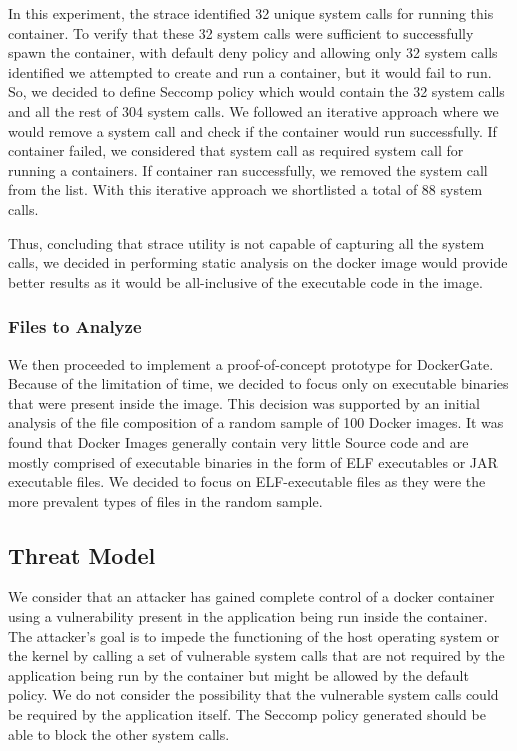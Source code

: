 In this experiment, the strace identified 32 unique system calls for running this container. To verify that these 32 system calls were sufficient to successfully spawn the container, with default deny policy and allowing only 32 system calls identified we attempted to create and run a container, but it would fail to run. So, we decided to define Seccomp policy which would contain the 32 system calls and all the rest of 304 system calls. We followed an iterative approach where we would remove a system call and check if the container would run successfully. If container failed, we considered that system call as required system call for running a containers. If container ran successfully, we removed the system call from the list. With this iterative approach we shortlisted a total of 88 system calls.

Thus, concluding that strace utility is not capable of capturing all the system calls, we decided in performing static analysis on the docker image would provide better results as it would be all-inclusive of the executable code in the image.

\subsubsection{Files to Analyze}

We then proceeded to implement a proof-of-concept prototype for DockerGate. Because of the limitation of time, we decided to focus only on executable binaries that were present inside the image. This decision was supported by an initial analysis of the file composition of a random sample of 100 Docker images. It was found that Docker Images generally contain very little Source code and are mostly comprised of executable binaries in the form of ELF executables or JAR executable files. We decided to focus on ELF-executable files as they were the more prevalent types of files in the random sample.

\subsection{Threat Model}
We consider that an attacker has gained complete control of a docker container using a vulnerability present in the application being run inside the container. The attacker’s goal is to impede the functioning of the host operating system or the kernel by calling a set of vulnerable system calls that are not required by the application being run by the container but might be allowed by the default policy. We do not consider the possibility that the vulnerable system calls could be required by the application itself. The Seccomp policy generated should be able to block the other system calls.